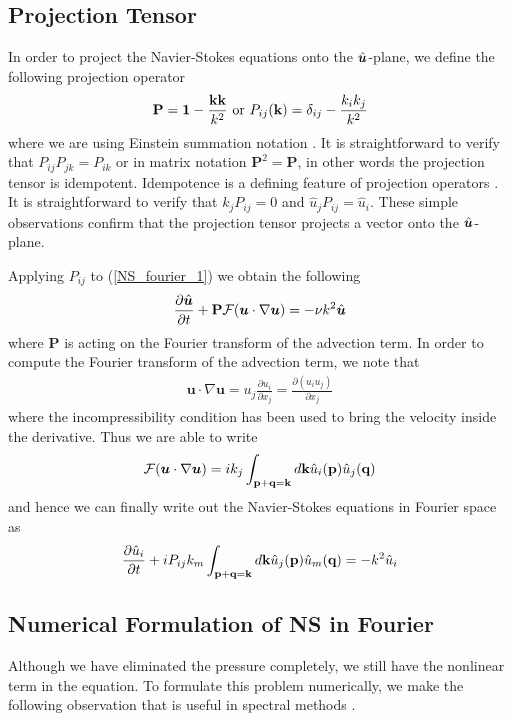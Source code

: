 \subsection{Projection Tensor}
In order to project the Navier-Stokes equations onto the $\hat{\bm{u}}$-plane, we define the following projection operator
\begin{align}
\textbf{P}=\textbf{1} - \frac{\textbf{k}\textbf{k}}{k^{2}} \text{ or } P_{ij}(\textbf{k}) = \delta_{ij} - \frac{k_{i}k_{j}}{k^{2}}
\end{align}
where we are using Einstein summation notation \cite{lesieur,wald}. It is straightforward to verify that $P_{ij}P_{jk}=P_{ik}$ or in matrix notation $\textbf{P}^{2}=\textbf{P}$, in other words the projection tensor is idempotent. Idempotence is a defining feature of projection operators \cite{MeyerLinAlg}. It is straightforward to verify that $k_{j}P_{ij}=0$ and $\hat{u}_{j}P_{ij}=\hat{u}_{i}$. These simple observations confirm that the projection tensor projects a vector onto the $\hat{\bm{u}}$-plane. 

Applying $P_{ij}$ to (\ref{NS_fourier_1}) we obtain the following 
\begin{align}
\frac{\partial \hat{\bm{u}}}{\partial t} + \textbf{P}\mathcal{F}(\bm{u}\cdot\nabla\bm{u}) =  -\nu k^{2}\hat{\bm{u}}\label{NS_fourier_3}
\end{align}
where $\textbf{P}$ is acting on the Fourier transform of the advection term. In order to compute the Fourier transform of the advection term, we note that 
\begin{align}
\bm{u}\cdot\nabla\bm{u} = u_{j}\frac{\partial u_{i}}{\partial x_{j}} = \frac{\partial (u_{i}u_{j})}{\partial x_{j}}
\end{align}
where the incompressibility condition has been used to bring the velocity inside the derivative. Thus we are able to write
\begin{align}
\mathcal{F}(\bm{u}\cdot\nabla\bm{u})=ik_{j}\int_{\textbf{p}+\textbf{q}=\textbf{k}}d\textbf{k}\hat{u}_{i}(\textbf{p})\hat{u}_{j}(\textbf{q})
\end{align}
and hence we can finally write out the Navier-Stokes equations in Fourier space as \cite{lesieur}
\begin{align}
\frac{\partial \hat{u}_{i}}{\partial t} + iP_{ij}k_{m}\int_{\textbf{p}+\textbf{q}=\textbf{k}}d\textbf{k}\hat{u}_{j}(\textbf{p})\hat{u}_{m}(\textbf{q})=  -k^{2}\hat{u}_{i}\label{NS_fourier_3}
\end{align}

\subsection{Numerical Formulation of NS in Fourier}
Although we have eliminated the pressure completely, we still have the nonlinear term in the equation. To formulate this problem numerically, we make the following observation that is useful in spectral methods \cite{lesieur,orszag1972}.

